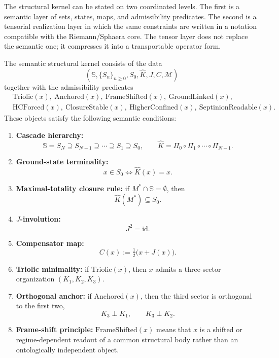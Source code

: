 The structural kernel can be stated on two coordinated levels. The first is a
semantic layer of sets, states, maps, and admissibility predicates. The second
is a tensorial realization layer in which the same constraints are written in a
notation compatible with the Riemann/Sphaera core. The tensor layer does not
replace the semantic one; it compresses it into a transportable operator form.

\begin{definition}
\label{def:semantic-structural-kernel}
The semantic structural kernel consists of the data
\[
(\mathbb S,\{S_n\}_{n\ge 0},S_0,\hat K,J,C,\mathcal M)
\]
together with the admissibility predicates
\[
\begin{aligned}
&\mathrm{Triolic}(x),\ \mathrm{Anchored}(x),\ \mathrm{FrameShifted}(x),\ \mathrm{GroundLinked}(x),\\
&\mathrm{HCForced}(x),\ \mathrm{ClosureStable}(x),\ \mathrm{HigherConfined}(x),\ \mathrm{SeptinionReadable}(x).
\end{aligned}
\]
These objects satisfy the following semantic conditions:
\begin{enumerate}[leftmargin=2em,label=(S\arabic*)]
\item \textbf{Cascade hierarchy:}
\[
\mathbb S=S_N\supseteq S_{N-1}\supseteq \cdots \supseteq S_1\supseteq S_0,
\qquad
\hat K=\Pi_0\circ\Pi_1\circ\cdots\circ\Pi_{N-1}.
\]
\item \textbf{Ground-state terminality:}
\[
x\in S_0 \Longleftrightarrow \hat K(x)=x.
\]
\item \textbf{Maximal-totality closure rule:} if $M^*\cap \mathbb S=\emptyset$, then
\[
\hat K(M^*)\subseteq S_0.
\]
\item \textbf{$J$-involution:}
\[
J^2=\mathrm{id}.
\]
\item \textbf{Compensator map:}
\[
C(x):=\tfrac12\bigl(x+J(x)\bigr).
\]
\item \textbf{Triolic minimality:} if $\mathrm{Triolic}(x)$, then $x$ admits a three-sector
organization $(K_1,K_2,K_3)$.
\item \textbf{Orthogonal anchor:} if $\mathrm{Anchored}(x)$, then the third sector is
orthogonal to the first two,
\[
K_3\perp K_1,
\qquad
K_3\perp K_2.
\]
\item \textbf{Frame-shift principle:} $\mathrm{FrameShifted}(x)$ means that $x$ is a shifted
or regime-dependent readout of a common structural body rather than an
ontologically independent object.
\end{enumerate}
\end{definition}

